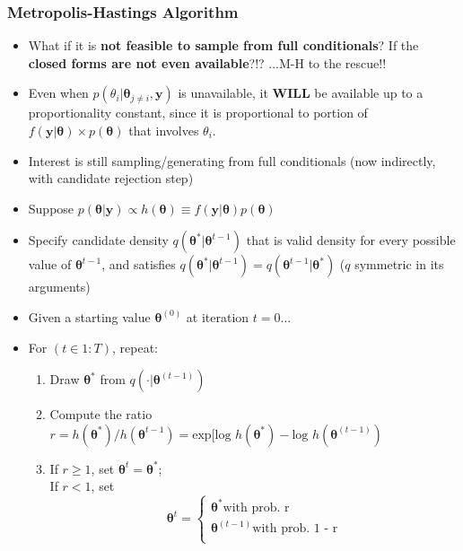 \subsubsection{Metropolis-Hastings Algorithm}
        \begin{itemize}
        \item What if it is {\bf not feasible to sample from full conditionals}? If the {\bf closed forms are not even available}?!? ...M-H to the rescue!!
        \item Even when $p(\theta_{i}|\pmb{\theta}_{j \neq i}, \pmb{y})$ is unavailable, it {\bf WILL} be available up to a proportionality constant, since it is proportional to portion of $f(\pmb{y}|\pmb{\theta})\times p(\pmb{\theta})$ that involves $\theta_{i}$.
        \item Interest is still sampling/generating from full conditionals (now indirectly, with candidate rejection step)
        \item Suppose $p(\pmb{\theta}|\pmb{y}) \propto h(\pmb{\theta}) \equiv f(\pmb{y}|\pmb{\theta})p(\pmb{\theta})$
        \item Specify candidate density $q(\pmb{\theta}^{*}|\pmb{\theta}^{t-1})$ that is valid density for every possible value of $\pmb{\theta}^{t-1}$, and satisfies $q(\pmb{\theta}^{*}|\pmb{\theta}^{t-1}) = q(\pmb{\theta}^{t-1}|\pmb{\theta}^{*})$ ($q$ symmetric in its arguments)
        \item Given a starting value $\pmb{\theta}^{(0)}$ at iteration $t=0$...
        \item For $(t \in 1:T)$, repeat:
            \begin{enumerate} %
            \item Draw $\pmb{\theta}^{*}$ from $q(\cdot|\pmb{\theta}^{(t-1)})$
            \item Compute the ratio $r=h(\pmb{\theta}^{*})/h(\pmb{\theta}^{t-1}) = \text{exp}[\text{log }h(\pmb{\theta}^{*}) - \text{log }h(\pmb{\theta}^{(t-1)}) $
            \item If $r \geq  1$, set $\pmb{\theta}^{t} = \pmb{\theta}^{*}$; \\
            If $r < 1$, set 
            \[ 
            \pmb{\theta}^{t} = 
            \begin{cases} 
            \pmb{\theta}^{*} \text{with prob. r} \\
            \pmb{\theta}^{(t-1)} \text{with prob. 1 - r} \\
            \end{cases}
            \]
            \end{enumerate} %
        \end{itemize} %


